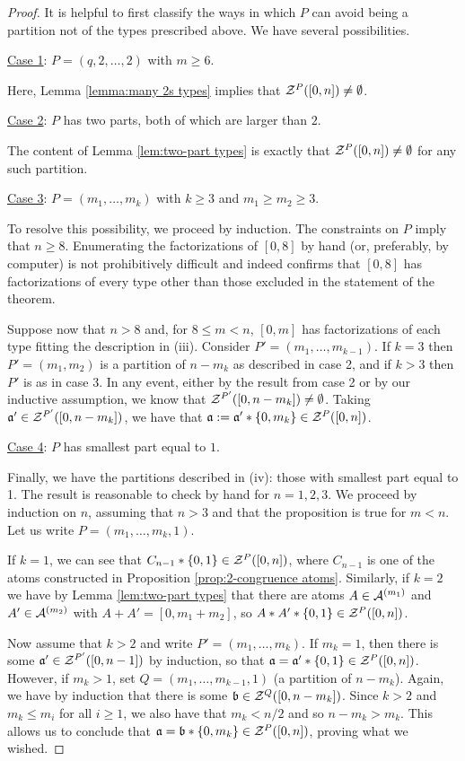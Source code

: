 \begin{proof}
	It is helpful to first classify the ways in which $P$ can avoid being a partition not of the types prescribed above.  
	We have several possibilities.
	
	
	\underline{Case 1}: $P = (q,2,\dots, 2)$ with $m\ge 6$.
	
	Here, Lemma \ref{lemma:many 2s types} implies that $\mathcal{Z}^P([ 0,n ]) \neq \emptyset$.
	
	\underline{Case 2}: $P$ has two parts, both of which are larger than $2$.
	
	The content of Lemma \ref{lem:two-part types} is exactly that $\mathcal{Z}^P([ 0,n ]) \neq \emptyset$ for any such partition.
	
	\underline{Case 3}: $P = (m_1,\dots, m_k)$ with $k\ge 3$ and $m_1\ge m_2 \ge 3$.
	
	To resolve this possibility, we proceed by induction.
	The constraints on $P$ imply that $n\ge 8$.  
	Enumerating the factorizations of $[ 0,8 ]$ by hand (or, preferably, by computer) is not prohibitively difficult and indeed confirms that $[ 0,8 ]$ has factorizations of every type other than those excluded in the statement of the theorem.
	
	Suppose now that $n > 8$ and, for $8\le m < n$, $[ 0,m ]$ has factorizations of each type fitting the description in (iii).
	Consider $P' = (m_1,\dots, m_{k-1})$.
	If $k=3$ then $P'=(m_1,m_2)$ is a partition of $n-m_k$ as described in case 2, and if $k>3$ then $P'$ is as in case 3.  
	In any event, either by the result from case 2 or by our inductive assumption, we know that $\mathcal{Z}^{P'}([ 0,n-m_k ]) \neq \emptyset$.
	Taking $\mathfrak{a}' \in \mathcal{Z}^{P'}([ 0,n-m_k ])$, we have that $\mathfrak{a} := \mathfrak{a}' * \{0,m_k\} \in \mathcal{Z}^P([ 0,n ])$.
	
	\underline{Case 4}: $P$ has smallest part equal to $1$.
	
	Finally, we have the partitions described in (iv): those with smallest part equal to 1.
	The result is reasonable to check by hand for $n=1,2,3$.
	We proceed by induction on $n$, assuming that $n>3$ and that the proposition is true for $m<n$.
	Let us write $P = (m_1,\dots, m_k, 1)$.
	
	If $k=1$, we can see that $C_{n-1}*\{0,1\}\in \mathcal{Z}^P([ 0,n ])$, where $C_{n-1}$ is one of the atoms constructed in Proposition \ref{prop:2-congruence atoms}.
	Similarly, if $k=2$ we have by Lemma \ref{lem:two-part types} that there are atoms $A\in \mathcal{A}^{(m_1)}$ and $A'\in \mathcal{A}^{(m_2)}$ with $A+A' = [ 0,m_1+m_2 ]$, so $A*A'* \{0,1\}\in \mathcal{Z}^P([ 0,n ])$.
	
	Now assume that $k>2$ and write $P' = (m_1,\dots, m_k)$.
	If $m_k=1$, then there is some $\mathfrak{a}'\in \mathcal{Z}^{P'}([ 0,n-1 ])$ by induction, so that $\mathfrak{a} = \mathfrak{a}' * \{0,1\}\in \mathcal{Z}^P([ 0,n ])$.
	However, if $m_k > 1$, set $Q = (m_1,\dots, m_{k-1}, 1)$ (a partition of $n-m_k$).
	Again, we have by induction that there is some $\mathfrak{b} \in \mathcal{Z}^Q([ 0, n-m_k ])$.
	Since $k>2$ and $m_k \le m_i$ for all $i\ge 1$, we also have that $m_k < n/2$ and so $n-m_k > m_k$.
	This allows us to conclude that $\mathfrak{a} = \mathfrak{b} * \{0,m_k\} \in \mathcal{Z}^P([ 0,n ])$, proving what we wished.
\end{proof}

